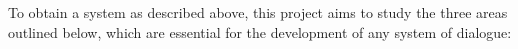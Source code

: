 To obtain a system as described above, this project aims to study the three
areas outlined below, which are essential for the development of any system of
dialogue:


